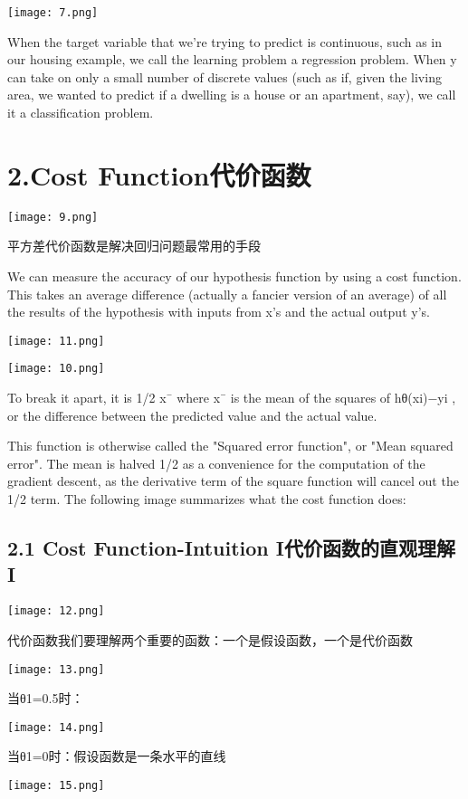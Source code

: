 \documentclass{article}
\begin{document}
\begin{CJK}{UTF8}{gbsn}
\texttt{[image: 7.png]}

When the target variable that we’re trying to predict is continuous, such as in our housing example, we call the learning problem a regression problem. When y can take on only a small number of discrete values (such as if, given the living area, we wanted to predict if a dwelling is a house or an apartment, say), we call it a classification problem.
\section*{2.Cost Function代价函数}
\texttt{[image: 9.png]}

平方差代价函数是解决回归问题最常用的手段

We can measure the accuracy of our hypothesis function by using a cost function. This takes an average difference (actually a fancier version of an average) of all the results of the hypothesis with inputs from x's and the actual output y's.

\texttt{[image: 11.png]}

\texttt{[image: 10.png]}

To break it apart, it is 1/2 x¯ where x¯ is the mean of the squares of hθ(xi)−yi , or the difference between the predicted value and the actual value.

This function is otherwise called the "Squared error function", or "Mean squared error". The mean is halved 1/2 as a convenience for the computation of the gradient descent, as the derivative term of the square function will cancel out the 1/2 term. The following image summarizes what the cost function does: 

\subsection*{2.1 Cost Function-Intuition I代价函数的直观理解 I}

\texttt{[image: 12.png]}

代价函数我们要理解两个重要的函数：一个是假设函数，一个是代价函数

\texttt{[image: 13.png]}

当θ1=0.5时：

\texttt{[image: 14.png]}

当θ1=0时：假设函数是一条水平的直线

\texttt{[image: 15.png]}


\end{CJK}
\end{document}
